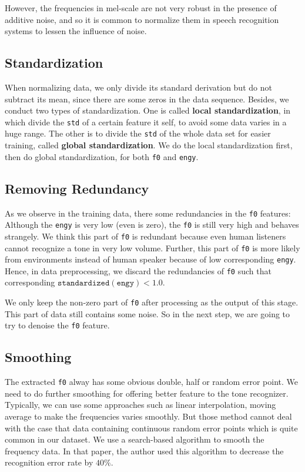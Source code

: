 \documentclass[a4paper]{article}
\begin{document}
However, the frequencies in mel-scale are not very robust in the presence of additive noise, and so it is common to normalize them in speech recognition systems to lessen the influence of noise.
\subsection{Standardization}
When normalizing data, we only divide its standard derivation but do not subtract its mean, since there are some zeros in the data sequence. Besides, we conduct two types of standardization. One is called \textbf{local standardization}, in which divide the \texttt{std} of a certain feature it self, to avoid some data varies in a huge range. The other is to divide the \texttt{std} of the whole data set for easier training, called \textbf{global standardization}. We do the local standardization first, then do global standardization, for both \texttt{f0} and \texttt{engy}.
\subsection{Removing Redundancy}
As we observe in the training data, there some redundancies in the \texttt{f0} features: Although the \texttt{engy} is very low (even is zero), the \texttt{f0} is still very high and behaves strangely. We think this part of \texttt{f0} is redundant because even human listeners cannot recognize a tone in very low volume. Further, this part of \texttt{f0} is more likely from environments instead of human speaker because of low corresponding \texttt{engy}. Hence, in data preprocessing, we discard the redundancies of \texttt{f0} such that corresponding $\mathtt{standardized(engy)} < 1.0$. 

We only keep the non-zero part of \texttt{f0} after processing as the output of this stage. This part of data still contains some noise. So in the next step, we are going to try to denoise the \texttt{f0} feature.

\subsection{Smoothing}
The extracted \texttt{f0} alway has some obvious double, half or random error point. We need to do further smoothing for offering better feature to the tone recognizer. Typically, we can use some approaches such as linear interpolation, moving average to make the frequencies varies smoothly. But those method cannot deal with the case that data containing continuous random error points which is quite common in our dataset. We use a search-based algorithm
to smooth the frequency data. In that paper, the author used this algorithm to decrease the recognition error rate by $40\%$. 
	
\end{document}
